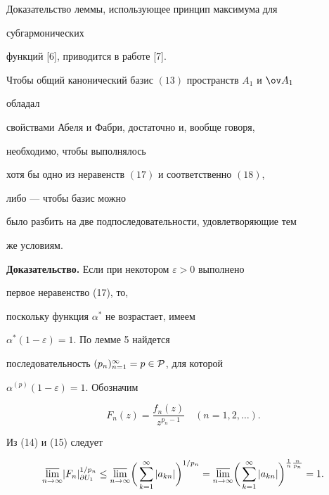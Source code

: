  


Доказательство леммы, использующее принцип максимума для 


субгармонических 


функций [6], приводится в работе [7]. 


 


\begin{thm} 


Чтобы общий канонический базис $(13)$ пространств $A_1$ и $\ov A_1$ 


обладал 


свойствами Абеля и Фабри, достаточно и, вообще говоря, 


необходимо, чтобы выполнялось 


хотя бы одно из неравенств $(17)$ и соответственно $(18)$, 


либо --- чтобы базис можно 


было разбить на две подпоследовательности, удовлетворяющие тем 


же условиям. 


\end{thm} 


 


{\bf Доказательство.} Если при некотором $\varepsilon>0$ выполнено 


первое неравенство (17), то, 


поскольку функция $\alpha^*$ не возрастает, имеем 


$\alpha^*(1-\varepsilon)=1$. По лемме 5 найдется 


последовательность $(p_n)^\infty_{n=1}=p\in\cal P$, для которой 


$\alpha^{(p)}(1-\varepsilon)=1$. Обозначим 


\begin{equation} 


F_n(z)=\frac{f_n(z)}{z^{p_n-1}}\quad (n=1,2,\dotsc). 


\end{equation} 


Из (14) и (15) следует 


\begin{equation} 


\underset{n\to\infty}{\varlimsup}{}|F_n|^{1/p_n}_{\partial U_1}\le 


\underset{n\to\infty}{\varlimsup}{}\bigg( 


\sum^\infty_{k=1}|a_{kn}|\bigg)^{1/p_n}= 


\underset{n\to\infty}{\varlimsup}{}\bigg( 


\sum^\infty_{k=1}|a_{kn}|\bigg)^{\frac{1}{n}\frac{n}{p_n}}=1. 


\end{equation} 


